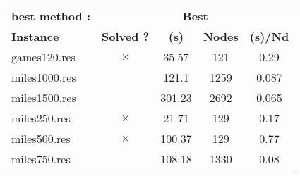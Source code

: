 \documentclass[main.tex]{subfiles}
\begin{document}
\thispagestyle{empty}

\begin{landscape}
\begin{center}
\begin{table}[h]
\centering
\caption{}
\label{}
\renewcommand{\arraystretch}{1.4} 
\begin{tabular}{|l|cccc|}
	\hline
\textbf{best method :} & \multicolumn{4}{c}{\textbf{Best}}\\
\textbf{Instance}  & \textbf{Solved ?} & \textbf{(s)} & \textbf{Nodes} & \textbf{(s)/Nd}\\\hline

games120.res & $\times$ & 35.57 & 121 & 0.29
\\
miles1000.res &  & 121.1 & 1259 & 0.087
\\
miles1500.res &  & 301.23 & 2692 & 0.065
\\
miles250.res & $\times$ & 21.71 & 129 & 0.17
\\
miles500.res & $\times$ & 100.37 & 129 & 0.77
\\
miles750.res &  & 108.18 & 1330 & 0.08
\\
\hline\end{tabular}
\end{table}
\end{center}
\end{landscape}
\end{document}
